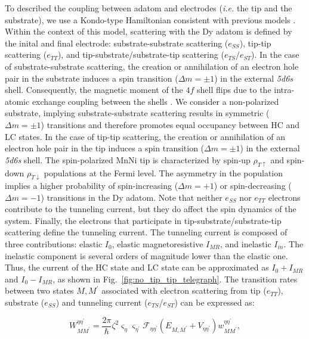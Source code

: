 \documentclass[
reprint,amsmath,amssymb,aps]{revtex4-2}
\begin{document}
To described the coupling between adatom and electrodes (\textit{i.e.} the tip and the substrate), we use a Kondo-type Hamiltonian consistent with previous models \cite{anderson1966,schrieffer1966,appelbaum1967,delgado2010,loth2010,Ternes2015}. Within the context of this model, scattering with the Dy adatom is defined by the inital and final electrode: substrate-substrate scattering ($e_{SS}$), tip-tip scattering ($e_{TT}$), and tip-substrate/substrate-tip scattering ($e_{TS}$/$e_{ST}$). In the case of substrate-substrate scattering, the creation or annihilation of an electron hole pair in the substrate induces a spin transition ($\Delta m=\pm 1$) in the external \textit{5d6s} shell. Consequently, the magnetic moment of the $4f$ shell flips due to the intra-atomic exchange coupling between the shells \cite{pivettaMeasuringIntraAtomicExchange2020}. We consider a non-polarized substrate, implying substrate-substrate scattering results in symmetric ($\Delta m=\pm 1$) transitions and therefore promotes equal occupancy between HC and LC states. In the case of tip-tip scattering, the creation or annihilation of an electron hole pair in the tip induces a spin transition ($\Delta m=\pm 1$) in the external \textit{5d6s} shell. The spin-polarized MnNi tip is characterized by spin-up $\rho_{T\uparrow}$ and spin-down $\rho_{T\downarrow}$ populations at the Fermi level. The asymmetry in the population implies a higher probability of spin-increasing ($\Delta m=+1$) or spin-decreasing ($\Delta m=-1$) transitions in the Dy adatom. Note that neither $e_{SS}$ nor $e_{TT}$ electrons contribute to the tunneling current, but they do affect the spin dynamics of the system. Finally, the electrons that participate in tip-substrate/substrate-tip scattering define the tunneling current. The tunneling current is composed of three contributions: elastic $I_0$, elastic magnetoresistive $I_{MR}$, and inelastic $I_{in}$. The inelastic component is several orders of magnitude lower than the elastic one. Thus, the current of the HC state and LC state can be approximated as $I_0+I_{MR}$ and $I_0-I_{MR}$, as shown in Fig.~\ref{fig:no_tip_tip_telegraph}. The transition rates between two states $M,M^{\prime}$ associated with electron scattering from tip ($e_{TT}$), substrate ($e_{SS}$) and tunneling current ($e_{TS}$/$e_{ST}$) can be expressed as:

\begin{equation}
    W_{MM^{\prime}}^{\eta \eta^{\prime}}=\dfrac{2\pi}{\hbar} \zeta^2 \varsigma_{\eta} \varsigma_{\eta^{\prime}} \mathcal{F}_{\eta\eta^{\prime}}( E_{M,M^{\prime}}+V_{\eta \eta^{\prime}} )  w_{MM^{\prime}}^{\eta \eta^{\prime}},
    \label{eq:elec_rates}
\end{equation}
\end{document}
